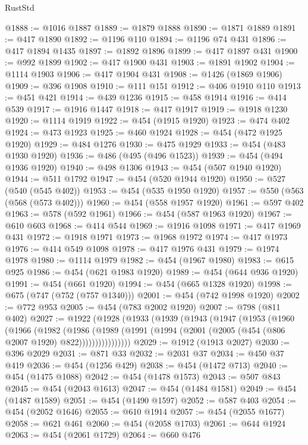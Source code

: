 \begin{lexlean}{RustStd}
\begin{coremodule}
@1888 := @1016 @1887
@1889 := @1879 @1888
@1890 := @1871 @1889
@1891 := @417 @1890
@1892 := @1196 @110
@1894 := @1196 @74 @431
@1896 := @417 @1894 @1435
@1897 := @1892 @1896
@1899 := @417 @1897 @431
@1900 := @992 @1899
@1902 := @417 @1900 @431
@1903 := @1891 @1902
@1904 := @1114 @1903
@1906 := @417 @1904 @431
@1908 := @1426 (@1869 @1906)
@1909 := @396 @1908
@1910 := @111 @151
@1912 := @406 @1910 @110
@1913 := @451 @421
@1914 := @439 @1236
@1915 := @458 @1914
@1916 := @414 @539
@1917 := @1916 @1447
@1918 := @417 @1917
@1919 := @1918 @1230
@1920 := @1114 @1919
@1922 := @454 (@1915 @1920)
@1923 := @474 @402
@1924 := @473 @1923
@1925 := @460 @1924
@1928 := @454 (@472 @1925 @1920)
@1929 := @484 @1276
@1930 := @475 @1929
@1933 := @454 (@483 @1930 @1920)
@1936 := @486 (@495 (@496 @1523))
@1939 := @454 (@494 @1936 @1920)
@1940 := @498 @1306
@1943 := @454 (@507 @1940 @1920)
@1944 := @511 @1792
@1947 := @454 (@520 @1944 @1920)
@1950 := @527 (@540 (@545 @402))
@1953 := @454 (@535 @1950 @1920)
@1957 := @550 (@563 (@568 (@573 @402)))
@1960 := @454 (@558 @1957 @1920)
@1961 := @597 @402
@1963 := @578 (@592 @1961)
@1966 := @454 (@587 @1963 @1920)
@1967 := @610 @603
@1968 := @414 @544
@1969 := @1916 @1098
@1971 := @417 @1969 @431
@1972 := @1918 @1971
@1973 := @1968 @1972
@1974 := @417 @1973
@1976 := @414 @549 @1098
@1978 := @417 @1976 @431
@1979 := @1974 @1978
@1980 := @1114 @1979
@1982 := @454 (@1967 @1980)
@1983 := @615 @925
@1986 := @454 (@621 @1983 @1920)
@1989 := @454 (@644 @936 @1920)
@1991 := @454 (@661 @1920)
@1994 := @454 (@665 @1328 @1920)
@1998 := @675 (@747 (@752 (@757 @1340)))
@2001 := @454 (@742 @1998 @1920)
@2002 := @772 @953
@2005 := @454 (@783 @2002 @1920)
@2007 := @798 (@811 @402)
@2027 := @1922
    (@1928
      (@1933
        (@1939
          (@1943
            (@1947
              (@1953
                (@1960
                  (@1966
                    (@1982
                      (@1986
                        (@1989
                          (@1991 (@1994 (@2001 (@2005 (@454 (@806 @2007 @1920) @822))))))))))))))))
@2029 := @1912 (@1913 @2027)
@2030 := @396 @2029
@2031 := @871 @33
@2032 := @2031 @37
@2034 := @450 @37 @419
@2036 := @454 (@1256 @429)
@2038 := @454 (@1472 @713)
@2040 := @454 (@1475 @1088)
@2042 := @454 (@1478 @1573)
@2043 := @507 @843
@2045 := @454 (@2043 @1613)
@2047 := @454 (@1484 @1581)
@2049 := @454 (@1487 @1589)
@2051 := @454 (@1490 @1597)
@2052 := @587 @403
@2054 := @454 (@2052 @1646)
@2055 := @610 @1914
@2057 := @454 (@2055 @1677)
@2058 := @621 @461
@2060 := @454 (@2058 @1703)
@2061 := @644 @1924
@2063 := @454 (@2061 @1729)
@2064 := @660 @476

\end{coremodule}
\end{lexlean}
